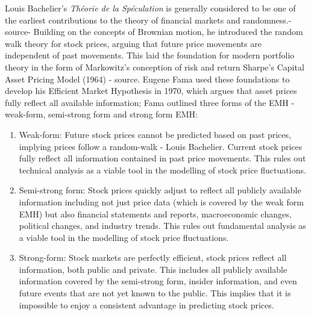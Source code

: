 \documentclass[12pt,a4paper]{article}
\begin{document}
Louis Bachelier’s \textit{Théorie de la Spéculation} is generally considered to be one of the earliest contributions to the theory of financial markets and randomness.-source- Building on the concepts of Brownian motion, he introduced the random walk theory for stock prices, arguing that future price movements are independent of past movements. 
This laid the foundation for modern portfolio theory in the form of 
Markowitz’s conception of risk and return Sharpe’s Capital Asset Pricing 
Model (1964) - source. Eugene Fama used these foundations to develop his 
Efficient Market Hypothesis in 1970, which argues that asset prices fully 
reflect all available information; Fama outlined three forms of the EMH - 
weak-form, semi-strong form and strong form EMH:
\begin{enumerate}
    \item Weak-form: Future stock prices cannot be predicted based on past prices, implying prices follow a random-walk - Louis Bachelier. Current stock prices fully reflect all information contained in past price movements. This rules out technical analysis as a viable tool in the modelling of stock price fluctuations.
    \item Semi-strong form: Stock prices quickly adjust to reflect all publicly available information including not just price data (which is covered by the weak form EMH)  but also financial statements and reports, macroeconomic changes, political changes, and industry trends. This rules out fundamental analysis as a viable tool in the modelling of stock price fluctuations.
    \item Strong-form: Stock markets are perfectly efficient, stock prices reflect all information, both public and private. This includes all publicly available information covered by the semi-strong form, insider information, and even future events that are not yet known to the public. This implies that it is impossible to enjoy a consistent advantage in predicting stock prices.
\end{enumerate}
\end{document}
